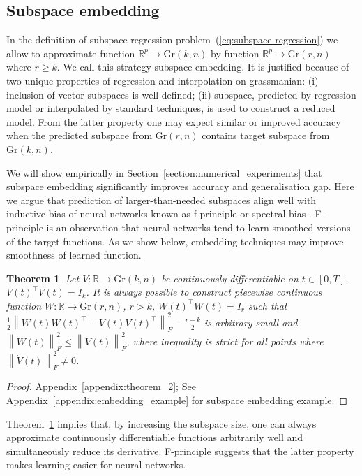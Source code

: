 \documentclass{article}
\newtheorem{theorem}{Theorem}
\begin{document}
\subsection{Subspace embedding}
\label{section:subspace_embedding}
In the definition of subspace regression problem~(\ref{eq:subspace regression}) we allow to approximate function $\mathbb{R}^{p}\rightarrow \text{Gr}(k, n)$ by function $\mathbb{R}^{p}\rightarrow \text{Gr}(r, n)$ where $r\geq k$. We call this strategy subspace embedding. It is justified because of two unique properties of regression and interpolation on grassmanian: (i) inclusion of vector subspaces is well-defined; (ii) subspace, predicted by regression model or interpolated by standard techniques, is used to construct a reduced model. From the latter property one may expect similar or improved accuracy when the predicted subspace from $\text{Gr}(r, n)$ contains target subspace from $\text{Gr}(k, n)$.

We will show empirically in Section~\ref{section:numerical_experiments} that subspace embedding significantly improves accuracy and generalisation gap. Here we argue that prediction of larger-than-needed subspaces align well with inductive bias of neural networks known as f-principle or spectral bias \cite{xu2019frequency}. F-principle is an observation that neural networks tend to learn smoothed versions of the target functions. As we show below, embedding techniques may improve smoothness of learned function.
\begin{theorem}
	\label{th:embedding_technique}
	Let $V:\mathbb{R}\rightarrow \text{Gr}(k, n)$ be continuously differentiable on $t\in[0, T]$, $V(t)^\top V(t) = I_{k}$. It is always possible to construct piecewise continuous function $W:\mathbb{R}\rightarrow \text{Gr}(r, n)$, $r>k$, $W(t)^\top W(t) = I_{r}$ such that $\frac{1}{2}\left\|W(t) W(t)^{\top} - V(t) V(t)^{\top}\right\|_{F}^2 - \frac{r-k}{2}$ is arbitrary small and $\left\|\dot{W}(t)\right\|_{F}^2 \leq \left\|\dot{V}(t)\right\|_{F}^2$, where inequality is strict for all points where $\left\|\dot{V}(t)\right\|_{F}^2 \neq 0$.
\end{theorem}
\begin{proof}Appendix~\ref{appendix:theorem_2}; See Appendix~\ref{appendix:embedding_example} for subspace embedding example.
\end{proof}
Theorem~\ref{th:embedding_technique} implies that, by increasing the subspace size, one can always approximate continuously differentiable functions arbitrarily well and simultaneously reduce its derivative. F-principle suggests that the latter property makes learning easier for neural networks.
\end{document}
